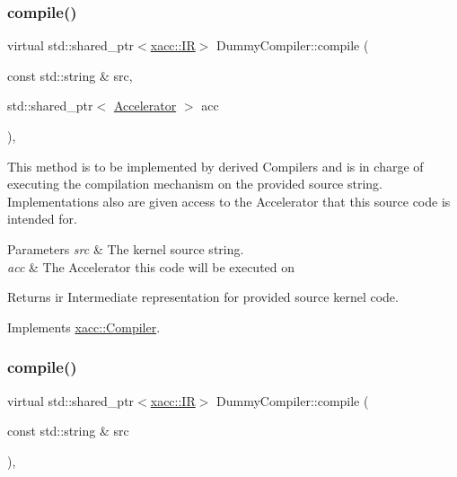 \subsubsection{\texorpdfstring{compile()}{compile()}\hspace{0.1cm}{\footnotesize\ttfamily [1/2]}}
{\footnotesize\ttfamily virtual std\+::shared\+\_\+ptr$<$\hyperlink{a02480}{xacc\+::\+IR}$>$ Dummy\+Compiler\+::compile (\begin{DoxyParamCaption}\item[{const std\+::string \&}]{src,  }\item[{std\+::shared\+\_\+ptr$<$ \hyperlink{a02432}{Accelerator} $>$}]{acc }\end{DoxyParamCaption})\hspace{0.3cm}{\ttfamily [inline]}, {\ttfamily [virtual]}}

This method is to be implemented by derived Compilers and is in charge of executing the compilation mechanism on the provided source string. Implementations also are given access to the Accelerator that this source code is intended for.


\begin{DoxyParams}{Parameters}
{\em src} & The kernel source string. \\
\hline
{\em acc} & The Accelerator this code will be executed on \\
\hline
\end{DoxyParams}
\begin{DoxyReturn}{Returns}
ir Intermediate representation for provided source kernel code. 
\end{DoxyReturn}


Implements \hyperlink{a02448_a546a40c95bb93af6a0c0ac48dbeaffc8}{xacc\+::\+Compiler}.

\mbox{\label{a02500_a40d7cc3bbc72a2ce9362136b3b83245c}} 
\subsubsection{\texorpdfstring{compile()}{compile()}\hspace{0.1cm}{\footnotesize\ttfamily [2/2]}}
{\footnotesize\ttfamily virtual std\+::shared\+\_\+ptr$<$\hyperlink{a02480}{xacc\+::\+IR}$>$ Dummy\+Compiler\+::compile (\begin{DoxyParamCaption}\item[{const std\+::string \&}]{src }\end{DoxyParamCaption})\hspace{0.3cm}{\ttfamily [inline]}, {\ttfamily [virtual]}}


